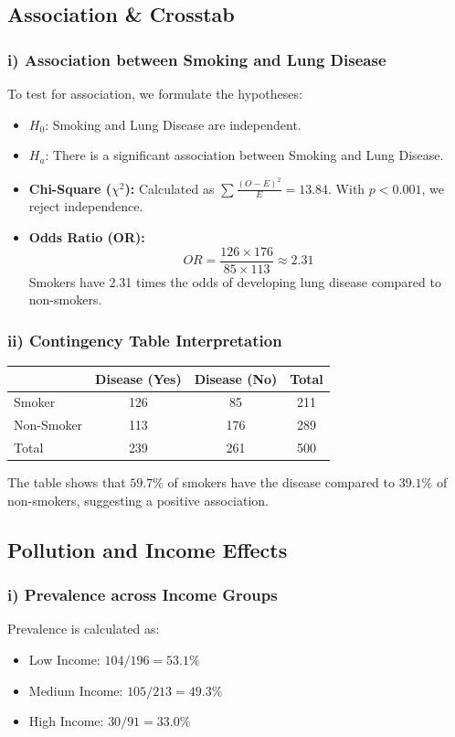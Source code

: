 \documentclass[12pt]{article}
\begin{document}
\subsection{Association \& Crosstab}

\subsubsection{i) Association between Smoking and Lung Disease}
To test for association, we formulate the hypotheses:
\begin{itemize}
    \item $H_0$: Smoking and Lung Disease are independent.
    \item $H_a$: There is a significant association between Smoking and Lung Disease.

    \item \textbf{Chi-Square ($\chi^2$):} Calculated as $\sum \frac{(O-E)^2}{E} = 13.84$. With $p < 0.001$, we reject independence.
    \item \textbf{Odds Ratio (OR):} 
    \[ OR = \frac{126 \times 176}{85 \times 113} \approx 2.31 \]
    Smokers have 2.31 times the odds of developing lung disease compared to non-smokers.

\end{itemize}
\subsubsection{ii) Contingency Table Interpretation}
\begin{table}[h!]
\centering
\begin{tabular}{@{}lccc@{}}
\toprule
 & Disease (Yes) & Disease (No) & Total \\ \midrule
Smoker & 126 & 85 & 211 \\
Non-Smoker & 113 & 176 & 289 \\ \midrule
Total & 239 & 261 & 500 \\ \bottomrule
\end{tabular}
\end{table}
The table shows that $59.7\%$ of smokers have the disease compared to $39.1\%$ of non-smokers, suggesting a positive association.

\subsection{Pollution and Income Effects}
\subsubsection{i) Prevalence across Income Groups}
Prevalence is calculated as:
\begin{itemize}
    \item Low Income: $104/196 = 53.1\%$
    \item Medium Income: $105/213 = 49.3\%$
    \item High Income: $30/91 = 33.0\%$
\end{itemize}
\end{document}
